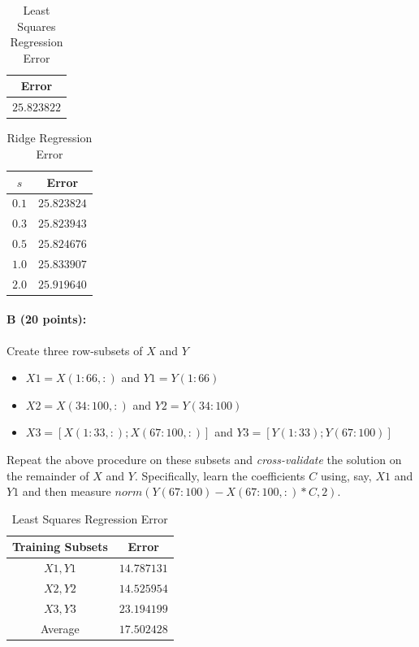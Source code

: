 \documentclass[11pt]{article}
\begin{document}
\begin{table}[!h] 
    \centering
    \caption{Least Squares Regression Error}
    \label{ErrOls}
    \begin{tabular}{|c|}
      \hline
    Error \\
      \hline      
      $25.823822$  \\
      \hline
    \end{tabular}
\end{table}
\begin{table}[!h] 
    \centering
    \caption{Ridge Regression Error}
    \label{ErrRidge}
    \begin{tabular}{|c|c|}
      \hline
   $s$  & Error \\
      \hline      
      $0.1$ &      $25.823824$  \\
      \hline
      $0.3$ &      $25.823943$  \\
      \hline
      $0.5$ &      $25.824676$  \\
      \hline
      $1.0$ &      $25.833907$  \\
      \hline
      $2.0$ &      $25.919640$  \\
      \hline
    \end{tabular}
\end{table}

\paragraph{B (20 points):}

Create three row-subsets of $X$ and $Y$

\begin{itemize}
\item $X1 = X(1:66,:)$ and $Y1 = Y(1:66)$
\item $X2 = X(34:100,:)$ and $Y2 = Y(34:100)$
\item $X3 = [X(1:33,:); X(67:100,:)]$ and $Y3 = [Y(1:33); Y(67:100)]$
\end{itemize}

Repeat the above procedure on these subsets and \textit{cross-validate} the solution on the remainder of $X$ and $Y$. Specifically, learn the coefficients $C$ using, say, $X1$ and $Y1$ and then measure $norm(Y(67:100) - X(67:100,:)*C,2)$.

\begin{table}[!h] 
    \centering
    \caption{Least Squares Regression Error}
    \label{ErrOls2}
    \begin{tabular}{|c|c|}
      \hline
   Training Subsets  & Error \\
      \hline      
      $X1, Y1$ &      $14.787131$  \\
      \hline
      $X2, Y2$ &      $14.525954$  \\
      \hline
      $X3, Y3$ &      $23.194199$  \\
      \hline
      Average &      $17.502428$  \\
      \hline
    \end{tabular}
\end{table}
\end{document}
